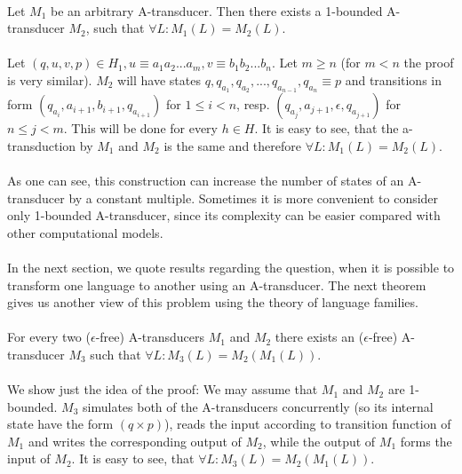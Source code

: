 \paragraph{}
\clema Let $M_{1}$ be an arbitrary A-transducer. Then there exists a 1-bounded A-transducer $M_{2}$, such that $\forall L: M_{1}(L) = M_{2}(L)$.

\paragraph{}
\dokaz Let $(q, u, v, p) \in H_{1}, u \equiv a_{1}a_{2}...a_{m}, v \equiv b_{1}b_{2}...b_{n}$. Let $m\geq n$ (for $m < n$ the proof is very similar). $M_{2}$ will have states $q, q_{a_{1}}, q_{a_{2}}, ..., q_{a_{n-1}}, q_{a_{n}} \equiv p$ and transitions in form $(q_{a_{i}}, a_{i+1}, b_{i+1}, q_{a_{i+1}})$ for $1 \leq i<n$, resp. $(q_{a_{j}}, a_{j+1}, \epsilon, q_{a_{j+1}})$ for $n \leq j < m$. This will be done for every $h \in H$. It is easy to see, that the a-transduction by $M_{1}$ and $M_{2}$ is the same and therefore $\forall L: M_{1}(L) = M_{2}(L)$. \square

\paragraph{}
As one can see, this construction can increase the number of states of an A-transducer by a constant multiple. Sometimes it is more convenient to consider only 1-bounded A-transducer, since its complexity can be easier compared with other computational models.

\paragraph{}
In the next section, we quote results regarding the question, when it is possible to transform one language to another using an A-transducer. The next theorem gives us another view of this problem using the theory of language families.

\paragraph{}
\clema For every two ($\epsilon $-free) A-transducers $M_{1}$ and $M_{2}$ there exists an ($\epsilon $-free) A-transducer $M_{3}$ such that $\forall L: M_{3}(L) = M_{2}(M_{1}(L))$.

\paragraph{}
\dokaz We show just the idea of the proof: We may assume that $M_{1}$ and $M_{2}$ are 1-bounded. $M_{3}$ simulates both of the A-transducers concurrently (so its internal state have the form $(q \times p)$), reads the input according to transition function of $M_{1}$ and writes the corresponding output of $M_{2}$, while the output of $M_{1}$ forms the input of $M_{2}$. It is easy to see, that $\forall L: M_{3}(L) = M_{2}(M_{1}(L))$. \square

